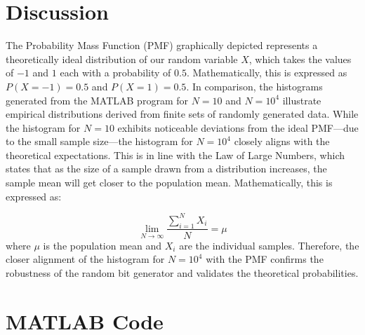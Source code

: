 \documentclass[12pt]{article}
\begin{document}
\section*{Discussion}
The Probability Mass Function (PMF) graphically depicted represents a theoretically ideal distribution of our random variable \(X\), which takes the values of \(-1\) and \(1\) each with a probability of \(0.5\). Mathematically, this is expressed as \( P(X = -1) = 0.5 \) and \( P(X = 1) = 0.5 \).
\newline\newline
In comparison, the histograms generated from the MATLAB program for \(N=10\) and \(N=10^4\) illustrate empirical distributions derived from finite sets of randomly generated data. While the histogram for \(N=10\) exhibits noticeable deviations from the ideal PMF—due to the small sample size—the histogram for \(N=10^4\) closely aligns with the theoretical expectations. This is in line with the Law of Large Numbers, which states that as the size of a sample drawn from a distribution increases, the sample mean will get closer to the population mean. Mathematically, this is expressed as:

\[
\lim_{{N \to \infty}} \frac{{\sum_{i=1}^{N} X_i}}{N} = \mu
\]
where \( \mu \) is the population mean and \( X_i \) are the individual samples.
\newline \newline
Therefore, the closer alignment of the histogram for \(N=10^4\) with the PMF confirms the robustness of the random bit generator and validates the theoretical probabilities. 

\section*{MATLAB Code}

\end{document}
